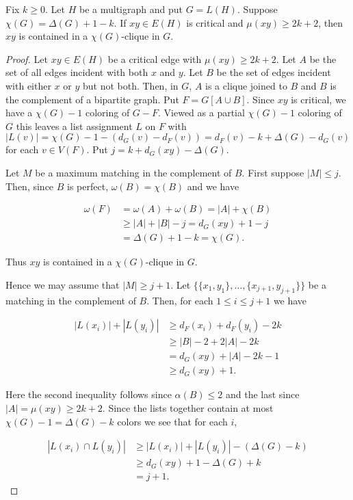 \begin{lem}\label{muBoundLemma}
Fix $k \geq 0$. Let $H$ be a multigraph and put $G = L(H)$.  Suppose $\chi(G) = \Delta(G) + 1 - k$. If $xy \in E(H)$ is critical and $\mu(xy) \geq 2k + 2$, then $xy$ is contained in a $\chi(G)$-clique in $G$.
\end{lem}
\begin{proof}
Let $xy \in E(H)$ be a critical edge with $\mu(xy) \geq 2k + 2$.  Let $A$ be the set of all edges incident with both $x$ and $y$.  Let $B$ be the set of edges incident with either $x$ or $y$ but not both.  Then, in $G$, $A$ is a clique joined to $B$ and $B$ is the complement of a bipartite graph.  Put $F = G[A \cup B]$.  Since $xy$ is critical, we have a $\chi(G) - 1$ coloring of $G - F$.  Viewed as a partial $\chi(G) - 1$ coloring of $G$ this leaves a list assignment $L$ on $F$ with 
$|L(v)| = \chi(G) - 1 - (d_G(v) - d_F(v)) = d_F(v) - k + \Delta(G) - d_G(v)$ for each $v \in V(F)$.  Put $j = k + d_G(xy) - \Delta(G)$.

Let $M$ be a maximum matching in the complement of $B$.  First suppose $|M| \leq j$.  Then, since $B$ is perfect, $\omega(B) = \chi(B)$ and we have

\begin{align*}
\omega(F) &= \omega(A) + \omega(B) = |A| + \chi(B) \\
&\geq |A| + |B| - j = d_G(xy) + 1 - j \\
&= \Delta(G) + 1 - k = \chi(G).
\end{align*}

\noindent Thus $xy$ is contained in a $\chi(G)$-clique in $G$.

Hence we may assume that $|M| \geq j + 1$.  Let $\{\{x_1, y_1\}, \ldots, \{x_{j+1}, y_{j+1}\}\}$ be a matching in the complement of $B$.  Then, for each $1 \leq i \leq j + 1$ we have

\begin{align*}
|L(x_i)| + |L(y_i)| &\geq d_F(x_i) + d_F(y_i) - 2k \\
&\geq |B| - 2 + 2|A| - 2k \\
&= d_G(xy) + |A| - 2k - 1 \\
&\geq d_G(xy) + 1.
\end{align*}

Here the second inequality follows since $\alpha(B) \leq 2$ and the last since $|A| = \mu(xy) \geq 2k + 2$.  Since the lists together contain at most $\chi(G) - 1 = \Delta(G) - k$ colors we see that for each $i$,

\begin{align*}
\left|L(x_i) \cap L(y_i)\right| &\geq |L(x_i)| + |L(y_i)| - (\Delta(G) - k) \\
&\geq d_G(xy) + 1 - \Delta(G) + k \\
&=j + 1.
\end{align*}


\end{proof}
